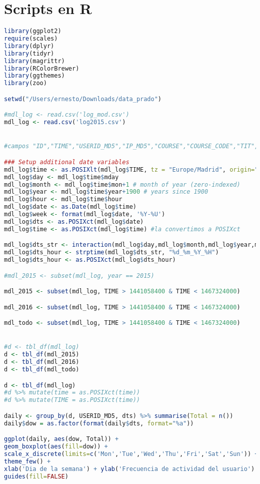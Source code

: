 \section{Scripts en R}
\begin{lstlisting}[language=r]
library(ggplot2)
require(scales)
library(dplyr)
library(tidyr)
library(magrittr)
library(RColorBrewer)
library(ggthemes)
library(zoo)

setwd("/Users/ernesto/Downloads/data_prado")

#mdl_log <- read.csv('log_mod.csv')
mdl_log <- read.csv('log2015.csv')


#campos "ID","TIME","USERID_MD5","IP_MD5","COURSE","COURSE_CODE","TIT","PLAN","CEA","MODULE","CMID","ACTION","URL","INFO"

### Setup additional date variables
mdl_log$time <- as.POSIXlt(mdl_log$TIME, tz = "Europe/Madrid", origin="1970-01-01")
mdl_log$day <- mdl_log$time$mday
mdl_log$month <- mdl_log$time$mon+1 # month of year (zero-indexed)
mdl_log$year <- mdl_log$time$year+1900 # years since 1900
mdl_log$hour <- mdl_log$time$hour
mdl_log$date <- as.Date(mdl_log$time)
mdl_log$week <- format(mdl_log$date, '%Y-%U')
mdl_log$dts <- as.POSIXct(mdl_log$date)
mdl_log$time <- as.POSIXct(mdl_log$time) #la convertimos a POSIXct

mdl_log$dts_str <- interaction(mdl_log$day,mdl_log$month,mdl_log$year,mdl_log$hour,sep='_')
mdl_log$dts_hour <- strptime(mdl_log$dts_str, "%d_%m_%Y_%H")
mdl_log$dts_hour <- as.POSIXct(mdl_log$dts_hour)

#mdl_2015 <- subset(mdl_log, year == 2015)

mdl_2015 <- subset(mdl_log, TIME > 1441058400 & TIME < 1467324000)

mdl_2016 <- subset(mdl_log, TIME > 1441058400 & TIME < 1467324000)

mdl_todo <- subset(mdl_log, TIME > 1441058400 & TIME < 1467324000)


#d <- tbl_df(mdl_log)
d <- tbl_df(mdl_2015)
d <- tbl_df(mdl_2016)
d <- tbl_df(mdl_todo)

d <- tbl_df(mdl_log)
#d %>% mutate(time = as.POSIXct(time))
#d %>% mutate(TIME = as.POSIXct(time))

daily <- group_by(d, USERID_MD5, dts) %>% summarise(Total = n())
daily$dow = as.factor(format(daily$dts, format="%a"))

ggplot(daily, aes(dow, Total)) +
geom_boxplot(aes(fill=dow)) +
scale_x_discrete(limits=c('Mon','Tue','Wed','Thu','Fri','Sat','Sun')) +
theme_few() +
xlab('Dia de la semana') + ylab('Frecuencia de actividad del usuario') +
guides(fill=FALSE)


\end{lstlisting}

